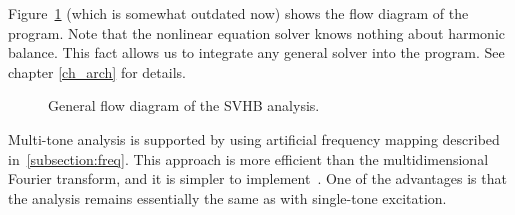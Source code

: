 Figure~\ref{fig:genflow} (which is somewhat outdated now) shows the
flow diagram of the program. Note that the nonlinear equation solver
knows nothing about harmonic balance. This fact allows us to integrate
any general solver into the program. See chapter \ref{ch_arch} for
details.
%
\begin{figure}[htpb]
\centerline{\epsfxsize=2in }
\caption{General flow diagram of the SVHB analysis.} \label{fig:genflow}
\end{figure}
%

Multi-tone analysis is supported by using artificial frequency mapping
described in~\ref{subsection:freq}. This approach is more efficient
than the multidimensional Fourier transform, and it is simpler to
implement~\cite{kundert:vincentelli:90}. One of the advantages is that
the analysis remains essentially the same as with single-tone
excitation.


